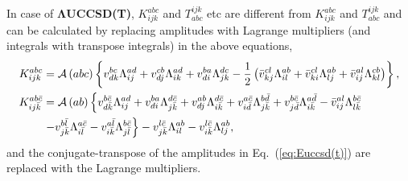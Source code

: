 \documentclass[a4paper,12pt,oneside]{book}
\newcommand{\asop}[1]{{\cal A}\left(#1\right)}
\newcommand{\eq}[1]{Eq.~(\ref{#1})}
\newcommand{\spa}[1]{{#1}}
\newcommand{\spb}[1]{\bar{#1}}
\newcommand{\half}{\frac{1}{2}}
\begin{document}
In case of \textbf{$\mathbf{\Lambda}$UCCSD(T)}, $K^{\spa{a}\spa{b}\spa{c}}_{\spa{i}\spa{j}\spa{k}}$ and $T_{\spa{a}\spa{b}\spa{c}}^{\spa{i}\spa{j}\spa{k}}$ etc 
are different from $K^{\spa{a}\spa{b}\spa{c}}_{\spa{i}\spa{j}\spa{k}}$ and $T_{\spa{a}\spa{b}\spa{c}}^{\spa{i}\spa{j}\spa{k}}$
and can be calculated by replacing amplitudes with Lagrange multipliers (and integrals with transpose integrals) in the above equations,
\begin{equation}
\begin{aligned}
K^{\spa{a}\spa{b}\spa{c}}_{\spa{i}\spa{j}\spa{k}} 
&= \asop{\spa{a}\spa{b}\spa{c}} \left\{ 
  v_{\spa{d}\spa{k}}^{\spa{b}\spa{c}} \Lambda_{\spa{i}\spa{j}}^{\spa{a}\spa{d}}
+ v_{\spa{d}\spa{j}}^{\spa{c}\spa{b}} \Lambda_{\spa{i}\spa{k}}^{\spa{a}\spa{d}}
+ v_{\spa{d}\spa{i}}^{\spa{b}\spa{a}} \Lambda_{\spa{j}\spa{k}}^{\spa{d}\spa{c}}
- \half\left(\bar v_{\spa{k}\spa{j}}^{\spa{c}\spa{l}} \Lambda_{\spa{i}\spa{l}}^{\spa{a}\spa{b}}
+ \bar v_{\spa{k}\spa{i}}^{\spa{c}\spa{l}} \Lambda_{\spa{l}\spa{j}}^{\spa{a}\spa{b}}
+ \bar v_{\spa{i}\spa{j}}^{\spa{a}\spa{l}} \Lambda_{\spa{k}\spa{l}}^{\spa{c}\spa{b}}
\right)
\right\},\\
K^{\spa{a}\spa{b}\spb{c}}_{\spa{i}\spa{j}\spb{k}} 
&= \asop{\spa{a}\spa{b}} \left\{ 
  v_{\spa{d}\spb{k}}^{\spa{b}\spb{c}} \Lambda_{\spa{i}\spa{j}}^{\spa{a}\spa{d}}
+ v_{\spa{d}\spa{i}}^{\spa{b}\spa{a}} \Lambda_{\spa{j}\spb{k}}^{\spa{d}\spb{c}}
+ v_{\spa{d}\spa{j}}^{\spa{a}\spa{b}} \Lambda_{\spa{i}\spb{k}}^{\spa{d}\spb{c}}
+ v_{\spa{i}\spb{d}}^{\spa{a}\spb{c}} \Lambda_{\spa{j}\spb{k}}^{\spa{b}\spb{d}}
+ v_{\spa{j}\spb{d}}^{\spa{b}\spb{c}} \Lambda_{\spa{i}\spb{k}}^{\spa{a}\spb{d}}
- \bar v_{\spa{i}\spa{j}}^{\spa{a}\spa{l}} \Lambda_{\spa{l}\spb{k}}^{\spa{b}\spb{c}}
\right.\\
&\left.
- v_{\spa{j}\spb{k}}^{\spa{b}\spb{l}} \Lambda_{\spa{i}\spb{l}}^{\spa{a}\spb{c}}
- v_{\spa{i}\spb{k}}^{\spa{a}\spb{l}} \Lambda_{\spa{j}\spb{l}}^{\spa{b}\spb{c}}
\right\}
- v_{\spa{j}\spb{k}}^{\spa{l}\spb{c}} \Lambda_{\spa{i}\spa{l}}^{\spa{a}\spa{b}}
- v_{\spa{i}\spb{k}}^{\spa{l}\spb{c}} \Lambda_{\spa{l}\spa{j}}^{\spa{a}\spa{b}}
,\\
\end{aligned}
\end{equation}
and the conjugate-transpose of the amplitudes in \eq{eq:Euccsd(t)} are replaced with the Lagrange multipliers.
\end{document}

